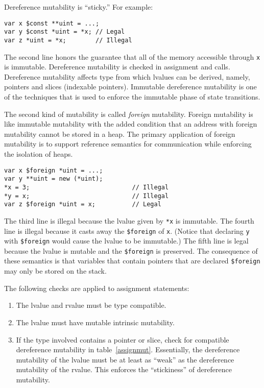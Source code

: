 Dereference mutability is ``sticky.''
For example:
\begin{verbatim}
var x $const **uint = ...;
var y $const *uint = *x; // Legal
var z *uint = *x;        // Illegal
\end{verbatim}
The second line honors the guarantee that all of the memory accessible through \verb+x+ is immutable.
Dereference mutability is checked in assignment and calls.
Dereference mutability affects type from which lvalues can be derived, namely, pointers and slices (indexable pointers).
Immutable dereference mutability is one of the techniques that is used to enforce the immutable phase of state transitions.

The second kind of mutability is called \emph{foreign} mutability.
Foreign mutability is like immutable mutability with the added condition that an address with foreign mutability cannot be stored in a heap.
The primary application of foreign mutability is to support reference semantics for communication while enforcing the isolation of heaps.
\begin{verbatim}
var x $foreign *uint = ...;
var y **uint = new (*uint);
*x = 3;                            // Illegal
*y = x;                            // Illegal
var z $foreign *uint = x;          // Legal
\end{verbatim}
The third line is illegal because the lvalue given by \verb+*x+ is immutable.
The fourth line is illegal because it casts away the \verb|$foreign| of \verb+x+.
(Notice that declaring \verb+y+ with \verb|$foreign| would cause the lvalue to be immutable.)
The fifth line is legal because the lvalue is mutable and the \verb|$foreign| is preserved.
The consequence of these semantics is that variables that contain pointers that are declared \verb|$foreign| may only be stored on the stack.


The following checks are applied to assignment statements:
\begin{enumerate}
\item The lvalue and rvalue must be type compatible.
\item The lvalue must have mutable intrinsic mutability.
\item If the type involved contains a pointer or slice, check for compatible dereference mutability in table~\ref{assignmut}.
  Essentially, the dereference mutability of the lvalue must be at least as ``weak'' as the dereference mutability of the rvalue.
  This enforces the ``stickiness'' of dereference mutability.
\end{enumerate}

